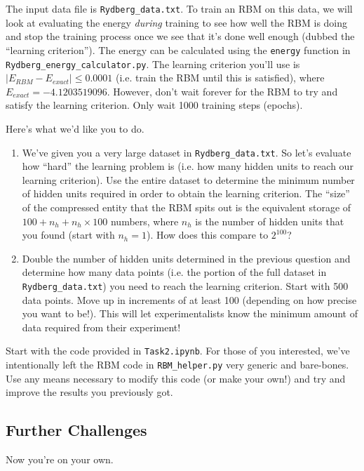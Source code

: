 \documentclass[12pt]{article}
\begin{document}
The input data file is \texttt{Rydberg\_data.txt}. To train an RBM on this data, we will look at evaluating the energy \textit{during} training to see how well the RBM is doing and stop the training process once we see that it's done well enough (dubbed the ``learning criterion''). The energy can be calculated using the \texttt{energy} function in \texttt{Rydberg\_energy\_calculator.py}. The learning criterion you'll use is $\vert E_{RBM} - E_{exact} \vert \leq 0.0001$ (i.e. train the RBM until this is satisfied), where $E_{exact} = -4.1203519096$. However, don't wait forever for the RBM to try and satisfy the learning criterion. Only wait 1000 training steps (epochs).

Here's what we'd like you to do.
\begin{enumerate}
    \item We've given you a very large dataset in \texttt{Rydberg\_data.txt}. So let's evaluate how ``hard'' the learning problem is (i.e. how many hidden units to reach our learning criterion). Use the entire dataset to determine the minimum number of hidden units required in order to obtain the learning criterion. The ``size'' of the compressed entity that the RBM spits out is the equivalent storage of $100 + n_h + n_h \times 100$ numbers, where $n_h$ is the number of hidden units that you found (start with $n_h = 1$). How does this compare to $2^{100}$? 
    \item Double the number of hidden units determined in the previous question and determine how many data points (i.e. the portion of the full dataset in \texttt{Rydberg\_data.txt}) you need to reach the learning criterion. Start with 500 data points. Move up in increments of at least 100 (depending on how precise you want to be!). This will let experimentalists know the minimum amount of data required from their experiment!
\end{enumerate}

Start with the code provided in \texttt{Task2.ipynb}. For those of you interested, we've intentionally left the RBM code in \texttt{RBM\_helper.py} very generic and bare-bones. Use any means necessary to modify this code (or make your own!) and try and improve the results you previously got.

\subsection*{Further Challenges} \label{sec:challenges}

Now you're on your own.



\end{document}
